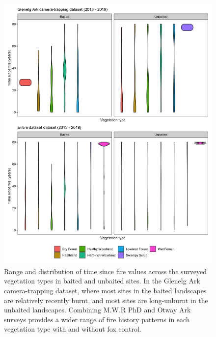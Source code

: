\documentclass[]{elsarticle} %
\begin{document}
\begin{figure}

{\centering \includegraphics[width=0.8\linewidth]{../figs/raw_data_tsf_veg} 

}

\caption{Range and distribution of time since fire values across the surveyed vegetation types in baited and unbaited sites. In the Glenelg Ark camera-trapping dataset, where most sites in the baited landscapes are relatively recently burnt, and most sites are long-unburnt in the unbaited landscapes. Combining M.W.R PhD and Otway Ark surveys provides a wider range of fire history patterns in each vegetation type with and without fox control.}\label{fig:veg-tsf-violin}
\end{figure}

\newpage
\end{document}
